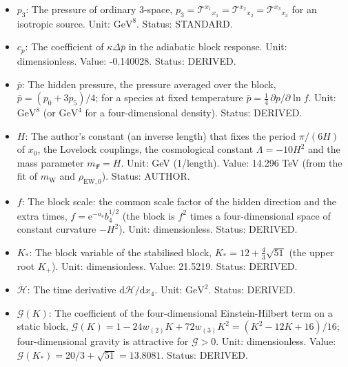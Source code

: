 \documentclass[
  10pt,
]{article}
\begin{document}
\begin{itemize}
  dimensionless. Value: -0.107556. Status: DERIVED.
\item
  \(p_3\): The pressure of ordinary 3-space,
  \(p_3 = \mathcal{T}^{x_1}{}_{x_1} = \mathcal{T}^{x_2}{}_{x_2} = \mathcal{T}^{x_3}{}_{x_3}\)
  for an isotropic source. Unit: \(\mathrm{GeV}^{8}\). Status: STANDARD.
\item
  \(c_p\): The coefficient of \(\kappa\Delta\bar p\) in the adiabatic
  block response. Unit: dimensionless. Value: -0.140028. Status:
  DERIVED.
\item
  \(\bar p\): The hidden pressure, the pressure averaged over the block,
  \(\bar p = (p_0 + 3p_5)/4\); for a species at fixed temperature
  \(\bar p = \frac14\,\partial p/\partial\ln f\). Unit:
  \(\mathrm{GeV}^{8}\) (or \(\mathrm{GeV}^{4}\) for a four-dimensional
  density). Status: DERIVED.
\item
  \(H\): The author's constant (an inverse length) that fixes the period
  \(\pi/(6H)\) of \(x_0\), the Lovelock couplings, the cosmological
  constant \(\Lambda = -10H^2\) and the mass parameter \(m_\Psi = H\).
  Unit: GeV (1/length). Value: 14.296 TeV (from the fit of
  \(m_{\mathrm{W}}\) and \(\rho_{\mathrm{EW},0}\)). Status: AUTHOR.
\item
  \(f\): The block scale: the common scale factor of the hidden
  direction and the extra times, \(f = \mathrm{e}^{-a_4}b_4^{1/2}\) (the
  block is \(f^2\) times a four-dimensional space of constant curvature
  \(-H^2\)). Unit: dimensionless. Status: DERIVED.
\item
  \(K_*\): The block variable of the stabilised block,
  \(K_* = 12 + \frac43\sqrt{51}\) (the upper root \(K_+\)). Unit:
  dimensionless. Value: 21.5219. Status: DERIVED.
\item
  \(\dot{\mathcal{H}}\): The time derivative
  \(\mathrm{d}\mathcal{H}/\mathrm{d}x_4\). Unit: \(\mathrm{GeV}^{2}\).
  Status: DERIVED.
\item
  \(\mathcal{G}(K)\): The coefficient of the four-dimensional
  Einstein-Hilbert term on a static block,
  \(\mathcal{G}(K) = 1 - 24w_{(2)}K + 72w_{(3)}K^2 = (K^2 - 12K + 16)/16\);
  four-dimensional gravity is attractive for \(\mathcal{G} > 0\). Unit:
  dimensionless. Value:
  \(\mathcal{G}(K_*) = 20/3 + \sqrt{51} = 13.8081\). Status: DERIVED.
\end{itemize}
\end{document}
